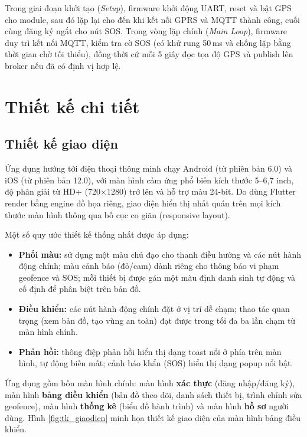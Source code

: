 \documentclass[../DoAn.tex]{subfiles}
\begin{document}
Trong giai đoạn khởi tạo (\textit{Setup}), firmware khởi động UART, reset và bật GPS cho module, sau đó lặp lại cho đến khi kết nối GPRS và MQTT thành công, cuối cùng đăng ký ngắt cho nút SOS. Trong vòng lặp chính (\textit{Main Loop}), firmware duy trì kết nối MQTT, kiểm tra cờ SOS (có khử rung 50\,ms và chống lặp bằng thời gian chờ tối thiểu), đồng thời cứ mỗi 5 giây đọc tọa độ GPS và publish lên broker nếu đã có định vị hợp lệ.

\section{Thiết kế chi tiết}

\subsection{Thiết kế giao diện}

Ứng dụng hướng tới điện thoại thông minh chạy Android (từ phiên bản 6.0) và iOS (từ phiên bản 12.0), với màn hình cảm ứng phổ biến kích thước 5--6,7 inch, độ phân giải từ HD+ (720$\times$1280) trở lên và hỗ trợ màu 24-bit. Do dùng Flutter render bằng engine đồ họa riêng, giao diện hiển thị nhất quán trên mọi kích thước màn hình thông qua bố cục co giãn (responsive layout).

Một số quy ước thiết kế thống nhất được áp dụng:

\begin{itemize}
    \item \textbf{Phối màu:} sử dụng một màu chủ đạo cho thanh điều hướng và các nút hành động chính; màu cảnh báo (đỏ/cam) dành riêng cho thông báo vi phạm geofence và SOS; mỗi thiết bị được gán một màu định danh sinh tự động và cố định để phân biệt trên bản đồ.
    \item \textbf{Điều khiển:} các nút hành động chính đặt ở vị trí dễ chạm; thao tác quan trọng (xem bản đồ, tạo vùng an toàn) đạt được trong tối đa ba lần chạm từ màn hình chính.
    \item \textbf{Phản hồi:} thông điệp phản hồi hiển thị dạng toast nổi ở phía trên màn hình, tự động biến mất; cảnh báo khẩn (SOS) hiển thị dạng popup nổi bật.
\end{itemize}

Ứng dụng gồm bốn màn hình chính: màn hình \textbf{xác thực} (đăng nhập/đăng ký), màn hình \textbf{bảng điều khiển} (bản đồ theo dõi, danh sách thiết bị, trình chỉnh sửa geofence), màn hình \textbf{thống kê} (biểu đồ hành trình) và màn hình \textbf{hồ sơ} người dùng. Hình \ref{fig:tk_giaodien} minh họa thiết kế giao diện của màn hình bảng điều khiển.
\end{document}
